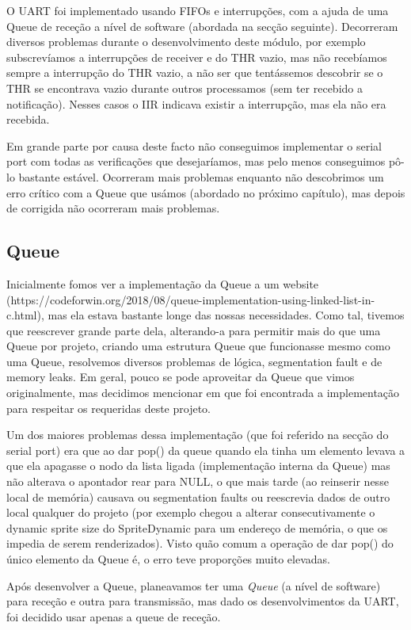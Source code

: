 \documentclass{report}
\begin{document}
O UART foi implementado usando FIFOs e interrupções, com a ajuda de uma Queue de receção a nível de software (abordada na secção seguinte). Decorreram diversos problemas durante o desenvolvimento deste módulo, por exemplo subscrevíamos a interrupções de receiver e do THR vazio, mas não recebíamos sempre a interrupção do THR vazio, a não ser que tentássemos descobrir se o THR se encontrava vazio durante outros processamos (sem ter recebido a notificação). Nesses casos o IIR indicava existir a interrupção, mas ela não era recebida.

Em grande parte por causa deste facto não conseguimos implementar o serial port com todas as verificações que desejaríamos, mas pelo menos conseguimos pô-lo bastante estável. Ocorreram mais problemas enquanto não descobrimos um erro crítico com a Queue que usámos (abordado no próximo capítulo), mas depois de corrigida não ocorreram mais problemas.

\subsection{Queue}

Inicialmente fomos ver a implementação da Queue a um website (https://codeforwin.org/2018/08/queue-implementation-using-linked-list-in-c.html), mas ela estava bastante longe das nossas necessidades. Como tal, tivemos que reescrever grande parte dela, alterando-a para permitir mais do que uma Queue por projeto, criando uma estrutura Queue que funcionasse mesmo como uma Queue, resolvemos diversos problemas de lógica, segmentation fault e de memory leaks. Em geral, pouco se pode aproveitar da Queue que vimos originalmente, mas decidimos mencionar em que foi encontrada a implementação para respeitar os requeridas deste projeto.

Um dos maiores problemas dessa implementação (que foi referido na secção do serial port) era que ao dar pop() da queue quando ela tinha um elemento levava a que ela apagasse o nodo da lista ligada (implementação interna da Queue) mas não alterava o apontador rear para NULL, o que mais tarde (ao reinserir nesse local de memória) causava ou segmentation faults ou reescrevia dados de outro local qualquer do projeto (por exemplo chegou a alterar consecutivamente o dynamic sprite size do SpriteDynamic para um endereço de memória, o que os impedia de serem renderizados). Visto quão comum a operação de dar pop() do único elemento da Queue é, o erro teve proporções muito elevadas.

Após desenvolver a Queue, planeavamos ter uma \textit{Queue} (a nível de software) para receção e outra para transmissão, mas dado os desenvolvimentos da UART, foi decidido usar apenas a queue de receção.
\end{document}
